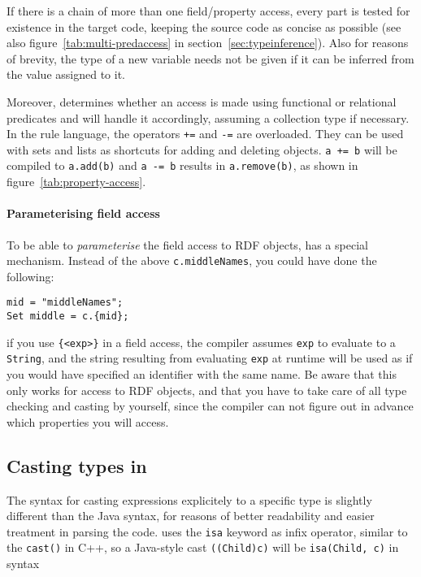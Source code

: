 If there is a chain of more than one field/property access, every part is
tested for existence in the target code, keeping the source code as concise as
possible (see also figure~\ref{tab:multi-predaccess} in
section~\ref{sec:typeinference}). Also for reasons of brevity, the type of a
new variable needs not be given if it can be inferred from the value assigned
to it.

Moreover, \vonda determines whether an access is made using functional or
relational predicates and will handle it accordingly, assuming a collection
type if necessary. In the rule language, the operators \texttt{+=} and
\texttt{-=} are overloaded. They can be used with sets and lists as shortcuts
for adding and deleting objects. \texttt{a += b} will be compiled to
\texttt{a.add(b)} and \texttt{a -= b} results in \texttt{a.remove(b)}, as shown
in figure~\ref{tab:property-access}.

\paragraph{Parameterising field access}\label{sec:field_access_expansion}

To be able to \emph{parameterise} the field access to RDF objects,
\vonda has a special mechanism. Instead of the above
\texttt{c.middleNames}, you could have done the following:

\begin{lstlisting}
mid = "middleNames";
Set middle = c.{mid};
\end{lstlisting}

if you use \verb|{<exp>}| in a field access, the compiler assumes
\texttt{exp} to evaluate to a \texttt{String}, and the string
resulting from evaluating \texttt{exp} at runtime will be used as if
you would have specified an identifier with the same name. Be aware
that this only works for access to RDF objects, and that you have to
take care of all type checking and casting by yourself, since the
compiler can not figure out in advance which properties you will access.

\subsection{Casting types in \vonda}
\label{sec:cast}

The syntax for casting expressions explicitely to a specific type is
slightly different than the Java syntax, for reasons of better
readability and easier treatment in parsing the code. \vonda uses the
\texttt{isa} keyword as infix operator, similar to the \texttt{cast()}
in C++, so a Java-style cast \texttt{((Child)c)} will be
\texttt{isa(Child, c)} in \vonda syntax

